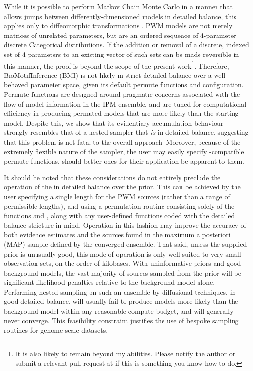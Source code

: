 While it is possible to perform Markov Chain Monte Carlo in a manner that allows jumps between differently-dimensioned models in detailed balance, this applies only to diffeomorphic transformations \cite{Hastie2012}. PWM models are not merely matrices of unrelated parameters, but are an ordered sequence of 4-parameter discrete Categorical distributions. If the addition or removal of a discrete, indexed set of 4 parameters to an existing vector of such sets can be made reversible in this manner, the proof is beyond the scope of the present work\footnote{It is also likely to remain beyond my abilities. Please notify the author or submit a relevant pull request at  if this is something you know how to do.}. Therefore, BioMotifInference (BMI) is not likely in strict detailed balance over a well behaved parameter space, given its default permute functions and configuration. Permute functions are designed around pragmatic concerns associated with the flow of model information in the IPM ensemble, and are tuned for computational efficiency in producing permuted models that are more likely than the starting model. Despite this, we show that its evidentiary accumulation behaviour strongly resembles that of a nested sampler that \textit{is} in detailed balance, suggesting that this problem is not fatal to the overall approach. Moreover, because of the extremely flexible nature of the sampler, the user may easily specify -compatible permute functions, should better ones for their application be apparent to them.

It should be noted that these considerations do not entirely preclude the operation of the  in detailed balance over the prior. This can be achieved by the user specifying a single length for the PWM sources (rather than a range of permissible lengths), and using a permutation routine consisting solely of the functions  and , along with any user-defined functions coded with the detailed balance stricture in mind. Operation in this fashion may improve the accuracy of both evidence estimates and the sources found in the maximum a posteriori (MAP) sample defined by the converged ensemble. That said, unless the supplied prior is unusually good, this mode of operation is only well suited to very small observation sets, on the order of kilobases. With uninformative priors and good background models, the vast majority of sources sampled from the prior will be significant likelihood penalties relative to the background model alone. Performing nested sampling on such an ensemble by diffusional techniques, in good detailed balance, will usually fail to produce models more likely than the background model within any reasonable compute budget, and will generally never converge. This feasibility constraint justifies the use of bespoke sampling routines for genome-scale datasets.

